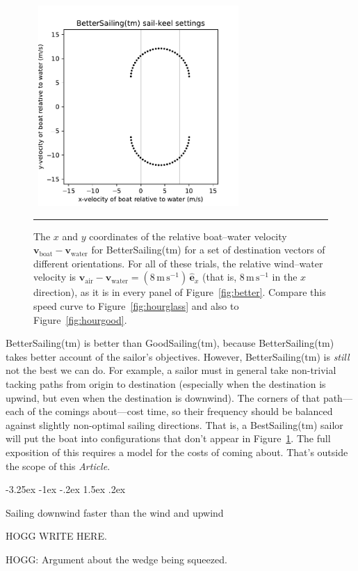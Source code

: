 \documentclass[letterpaper]{article}
\makeatletter
\renewcommand{\vec}[1]{\boldsymbol{#1}}
\newcommand{\uvec}{\vec{\hat{e}}}
\newcommand{\air}{\text{air}}
\newcommand{\water}{\text{water}}
\newcommand{\boat}{\text{boat}}
\newcommand{\vair}{\vec{v}_\air}
\newcommand{\vwater}{\vec{v}_\water}
\newcommand{\vboat}{\vec{v}_\boat}
\newcommand{\mps}{\mathrm{m\,s^{-1}}}
\newcommand{\documentname}{\textsl{Article}}
\newcommand{\figref}[1]{Figure~\ref{#1}}
\renewcommand\section{\@startsection {section}{1}{\z@}%
  {-3.25ex \@plus -1ex \@minus -.2ex}%
  {1.5ex \@plus .2ex}%
  {\raggedright\normalfont\large\bfseries}}
\newcommand{\figurerule}{\rule[1ex]{\textwidth}{0.2pt}}
\makeatother
\begin{document}
\begin{figure}[t!]
  ~\hfill\includegraphics[width=3in]{hourglass-better.pdf}\hfill~
  \caption{The $x$ and $y$ coordinates of the relative boat--water velocity $\vboat-\vwater$ for BetterSailing(tm) for a set of destination vectors of different orientations.
  For all of these trials, the relative wind--water velocity is $\vair-\vwater=(8\,\mps)\,\uvec_x$ (that is, $8\,\mps$ in the $x$ direction), as it is in every panel of \figref{fig:better}.
  Compare this speed curve to \figref{fig:hourglass} and also to \figref{fig:hourgood}.\label{fig:hourbetter}}
  \figurerule
\end{figure}

BetterSailing(tm) is better than GoodSailing(tm), because BetterSailing(tm) takes better account of the sailor's objectives.
However, BetterSailing(tm) is \emph{still} not the best we can do.
For example, a sailor must in general take non-trivial tacking paths from origin to destination (especially when the destination is upwind, but even when the destination is downwind).
The corners of that path---each of the comings about---cost time, so their frequency should be balanced against slightly non-optimal sailing directions.
That is, a BestSailing(tm) sailor will put the boat into configurations that don't appear in \figref{fig:hourbetter}.
The full exposition of this requires a model for the costs of coming about.
That's outside the scope of this \documentname.

\section{Sailing downwind faster than the wind and upwind}\label{sec:upwind}

HOGG WRITE HERE.

HOGG: Argument about the wedge being squeezed.
\end{document}
